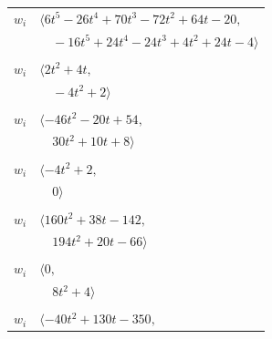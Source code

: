 \documentclass[11pt]{article}
\begin{document}
\begin{longtable}{@{}ll@{}}
$w_i$ & $\langle 6t^{5}-26t^{4}+70t^{3}-72t^{2}+64t-20,$\\
 & $\quad -16t^{5}+24t^{4}-24t^{3}+4t^{2}+24t-4\rangle$\\
\addlinespace[2pt]
\multicolumn{2}{@{}p{0.97\textwidth}@{}}{$i=6$, $D_i=1$, $\rho_{ij}$: $18{:}1, \allowbreak 19{:}1, \allowbreak 22{:}2, \allowbreak 23{:}1, \allowbreak 27{:}2, \allowbreak 28{:}2$}\\
$w_i$ & $\langle 2t^{2}+4t,$\\
 & $\quad -4t^{2}+2\rangle$\\
\addlinespace[2pt]
\multicolumn{2}{@{}p{0.97\textwidth}@{}}{$i=7$, $D_i=1$, $\rho_{ij}$: $1{:}2, \allowbreak 5{:}2, \allowbreak 17{:}1, \allowbreak 19{:}2, \allowbreak 24{:}1, \allowbreak 29{:}1, \allowbreak 33{:}1, \allowbreak 34{:}2$}\\
$w_i$ & $\langle -46t^{2}-20t+54,$\\
 & $\quad 30t^{2}+10t+8\rangle$\\
\addlinespace[2pt]
\multicolumn{2}{@{}p{0.97\textwidth}@{}}{$i=8$, $D_i=1$, $\rho_{ij}$: $0{:}1, \allowbreak 2{:}2, \allowbreak 18{:}2, \allowbreak 25{:}2, \allowbreak 32{:}1, \allowbreak 34{:}1$}\\
$w_i$ & $\langle -4t^{2}+2,$\\
 & $\quad 0\rangle$\\
\addlinespace[2pt]
\multicolumn{2}{@{}p{0.97\textwidth}@{}}{$i=9$, $D_i=1$, $\rho_{ij}$: $1{:}2, \allowbreak 5{:}1, \allowbreak 12{:}2, \allowbreak 15{:}2, \allowbreak 16{:}2, \allowbreak 17{:}1, \allowbreak 20{:}1, \allowbreak 25{:}2, \allowbreak 27{:}1, \allowbreak 33{:}2$}\\
$w_i$ & $\langle 160t^{2}+38t-142,$\\
 & $\quad 194t^{2}+20t-66\rangle$\\
\addlinespace[2pt]
\multicolumn{2}{@{}p{0.97\textwidth}@{}}{$i=10$, $D_i=1$, $\rho_{ij}$: $0{:}2, \allowbreak 1{:}2, \allowbreak 2{:}1, \allowbreak 5{:}2, \allowbreak 17{:}1, \allowbreak 28{:}2$}\\
$w_i$ & $\langle 0,$\\
 & $\quad 8t^{2}+4\rangle$\\
\addlinespace[2pt]
\multicolumn{2}{@{}p{0.97\textwidth}@{}}{$i=11$, $D_i=1$, $\rho_{ij}$: $4{:}2, \allowbreak 13{:}2, \allowbreak 14{:}1, \allowbreak 15{:}2, \allowbreak 21{:}1, \allowbreak 22{:}2, \allowbreak 23{:}2, \allowbreak 30{:}2, \allowbreak 34{:}1$}\\
$w_i$ & $\langle -40t^{2}+130t-350,$\\

\end{longtable}
\end{document}
